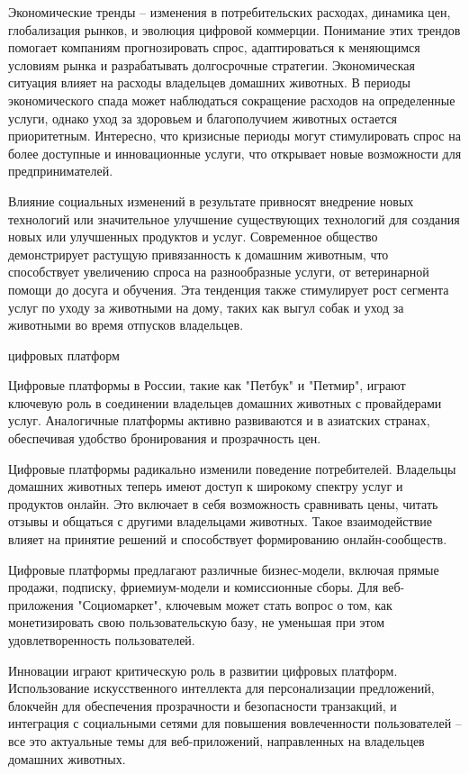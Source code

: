 Экономические тренды – изменения в потребительских расходах, динамика цен, глобализация рынков, и эволюция цифровой коммерции. Понимание этих трендов помогает компаниям прогнозировать спрос, адаптироваться к меняющимся условиям рынка и разрабатывать долгосрочные стратегии. Экономическая ситуация влияет на расходы владельцев домашних животных. В периоды экономического спада может наблюдаться сокращение расходов на определенные услуги, однако уход за здоровьем и благополучием животных остается приоритетным. Интересно, что кризисные периоды могут стимулировать спрос на более доступные и инновационные услуги, что открывает новые возможности для предпринимателей.

Влияние социальных изменений в результате привносят внедрение новых технологий или значительное улучшение существующих технологий для создания новых или улучшенных продуктов и услуг. Современное общество демонстрирует растущую привязанность к домашним животным, что способствует увеличению спроса на разнообразные услуги, от ветеринарной помощи до досуга и обучения. Эта тенденция также стимулирует рост сегмента услуг по уходу за животными на дому, таких как выгул собак и уход за животными во время отпусков владельцев.

 цифровых платформ

Цифровые платформы в России, такие как "Петбук" и "Петмир", играют ключевую роль в соединении владельцев домашних животных с провайдерами услуг. Аналогичные платформы активно развиваются и в азиатских странах, обеспечивая удобство бронирования и прозрачность цен.

Цифровые платформы радикально изменили поведение потребителей. Владельцы домашних животных теперь имеют доступ к широкому спектру услуг и продуктов онлайн. Это включает в себя возможность сравнивать цены, читать отзывы и общаться с другими владельцами животных. Такое взаимодействие влияет на принятие решений и способствует формированию онлайн-сообществ.

Цифровые платформы предлагают различные бизнес-модели, включая прямые продажи, подписку, фриемиум-модели и комиссионные сборы. Для веб-приложения "Социомаркет", ключевым может стать вопрос о том, как монетизировать свою пользовательскую базу, не уменьшая при этом удовлетворенность пользователей.

Инновации играют критическую роль в развитии цифровых платформ. Использование искусственного интеллекта для персонализации предложений, блокчейн для обеспечения прозрачности и безопасности транзакций, и интеграция с социальными сетями для повышения вовлеченности пользователей – все это актуальные темы для веб-приложений, направленных на владельцев домашних животных.

